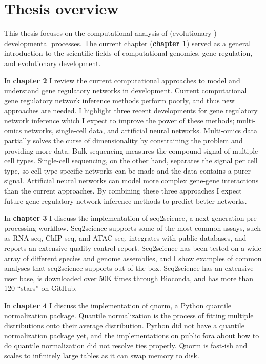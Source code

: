 \section{Thesis overview}

This thesis focuses on the computational analysis of (evolutionary-) developmental processes. The current chapter (\textbf{chapter 1}) served as a general introduction to the scientific fields of computational genomics, gene regulation, and evolutionary development.  

In \textbf{chapter 2} I review the current computational approaches to model and understand gene regulatory networks in development. Current computational gene regulatory network inference methods perform poorly, and thus new approaches are needed. I highlight three recent developments for gene regulatory network inference which I expect to improve the power of these methods; multi-omics networks, single-cell data, and artificial neural networks. Multi-omics data partially solves the curse of dimensionality by constraining the problem and providing more data. Bulk sequencing measures the compound signal of multiple cell types. Single-cell sequencing, on the other hand, separates the signal per cell type, so cell-type-specific networks can be made and the data contains a purer signal. Artificial neural networks can model more complex gene-gene interactions than the current approaches. By combining these three approaches I expect future gene regulatory network inference methods to predict better networks.

In \textbf{chapter 3} I discuss the implementation of seq2science, a next-generation pre-processing workflow. Seq2science supports some of the most common assays, such as RNA-seq, ChIP-seq, and ATAC-seq, integrates with public databases, and reports an extensive quality control report. Seq2science has been tested on a wide array of different species and genome assemblies, and I show examples of common analyses that seq2science supports out of the box. Seq2science has an extensive user base\cite{Bright_2021,Xu_2020,Wester2021,SantosBarriopedro2021,Heuts2023,Tholen2023,Harlaar2022,LunaVelez2023,Neikes2023,Vierboom2021,Smits2020,Smits2022,Heuts2022,Rother2023}, is downloaded over 50K times through Bioconda, and has more than 120 ``stars'' on GitHub.

In \textbf{chapter 4} I discuss the implementation of qnorm, a Python quantile normalization package. Quantile normalization is the process of fitting multiple distributions onto their average distribution. Python did not have a quantile normalization package yet, and the implementations on public fora about how to do quantile normalization did not resolve ties properly. Qnorm is fast-ish and scales to infinitely large tables as it can swap memory to disk.

